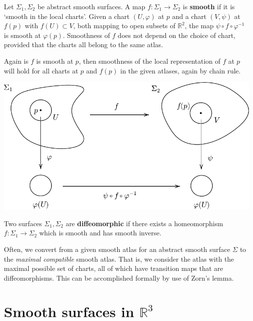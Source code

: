 \documentclass[a4paper]{article}
\begin{document}
\begin{definition}
	Let \( \Sigma_1, \Sigma_2 \) be abstract smooth surfaces.
	A map \( f \colon \Sigma_1 \to \Sigma_2 \) is \textbf{smooth} if it is `smooth in the local charts'.
	Given a chart \( (U, \varphi) \) at \( p \) and a chart \( (V, \psi) \) at \( f(p) \) with $ f(U) \subset V $, both mapping to open subsets of \( \mathbb R^2 \), the map \( \psi \circ f \circ \varphi^{-1} \) is smooth at \( \varphi(p) \).
	Smoothness of \( f \) does not depend on the choice of chart, provided that the charts all belong to the same atlas.
\end{definition}
Again is $f$ is smooth at $p$, then smoothness of the local representation of $f$ at $p$ will hold for all charts at $p$ and $f(p)$ in the given atlases, again by chain rule.
\begin{center}
\includegraphics[scale=0.8]{SmoothFunction2}
\end{center}
\begin{definition}
	Two surfaces \( \Sigma_1, \Sigma_2 \) are \textbf{diffeomorphic} if there exists a homeomorphism \( f \colon \Sigma_1 \to \Sigma_2 \) which is smooth and has smooth inverse.
\end{definition}
\begin{remark}
	Often, we convert from a given smooth atlas for an abstract smooth surface \( \Sigma \) to the \textit{maximal compatible} smooth atlas.
	That is, we consider the atlas with the maximal possible set of charts, all of which have transition maps that are diffeomorphisms.
	This can be accomplished formally by use of Zorn's lemma.
\end{remark}

\section{Smooth surfaces in \( \mathbb R^3 \)}
\end{document}
